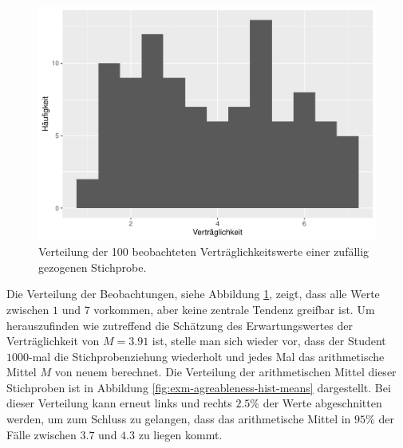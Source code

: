 \documentclass[
]{book}
\theoremstyle{definition}
\theoremstyle{definition}
\theoremstyle{definition}
\theoremstyle{definition}
\theoremstyle{remark}
\begin{document}
\begin{figure}

{\centering \includegraphics{aps_statistik1_files/figure-latex/exm-agreableness-hist-1} 

}

\caption{Verteilung der 100 beobachteten Verträglichkeitswerte einer zufällig gezogenen Stichprobe.}\label{fig:exm-agreableness-hist}
\end{figure}

Die Verteilung der Beobachtungen, siehe Abbildung \ref{fig:exm-agreableness-hist}, zeigt, dass alle Werte zwischen \(1\) und \(7\) vorkommen, aber keine zentrale Tendenz greifbar ist. Um herauszufinden wie zutreffend die Schätzung des Erwartungswertes der Verträglichkeit von \(M=3.91\) ist, stelle man sich wieder vor, dass der Student \(1000\)-mal die Stichprobenziehung wiederholt und jedes Mal das arithmetische Mittel \(M\) von neuem berechnet. Die Verteilung der arithmetischen Mittel dieser Stichproben ist in Abbildung \ref{fig:exm-agreableness-hist-means} dargestellt. Bei dieser Verteilung kann erneut links und rechts \(2.5\%\) der Werte abgeschnitten werden, um zum Schluss zu gelangen, dass das arithmetische Mittel in \(95\%\) der Fälle zwischen \(3.7\) und \(4.3\) zu liegen kommt.
\end{document}
